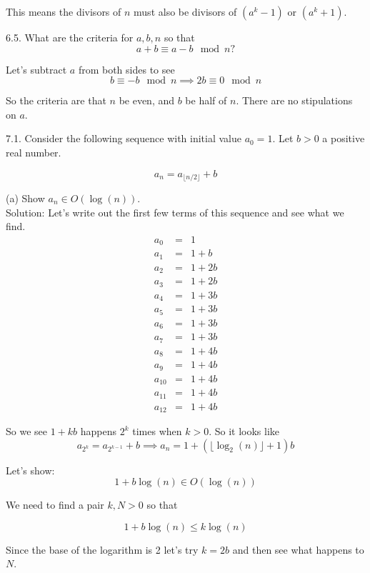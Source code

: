 \documentclass[16 pt]{amsart}
\theoremstyle{definition}
\theoremstyle{remark}
\numberwithin{equation}{subsection}
\begin{document}
This means the divisors of $n$ must also be divisors of $(a^k-1)$ or $(a^k+1)$.



6.5. What are the criteria for $a,b,n$ so that
\[
a+b \equiv a-b \mod{n} ?
\]

Let's subtract $a$ from both sides to see
\[
b \equiv -b \mod n \implies 2b \equiv 0 \mod n
\]

So the criteria are that $n$ be even, and $b$ be half of $n$.  There are no stipulations on $a$.



\newpage

7.1.  Consider the following sequence with initial value $a_0=1$.  Let $b>0$ a positive real number.

\[
a_n = a_{\lfloor n/2 \rfloor} + b
\]

(a) Show $a_n \in O(\log(n))$.\\

Solution:  Let's write out the first few terms of this sequence and see what we find.
\begin{eqnarray}
a_0 & = & 1\nonumber \\
a_1 & = & 1+b\nonumber \\
a_2 & = & 1 + 2b\nonumber \\
a_3 & = & 1+ 2b\nonumber \\
a_4 & = & 1+ 3b\nonumber \\
a_5 & = & 1+3b\nonumber \\
a_6 & = & 1+3b\nonumber \\
a_7 & = & 1+3b\nonumber \\
a_8 & = & 1+4b\nonumber \\
a_9 & = & 1+4b\nonumber \\
a_{10} & = & 1+4b\nonumber \\
a_{11} & = & 1+4b\nonumber \\
a_{12} & = & 1+4b\nonumber 
\end{eqnarray}


So we see $1+kb$ happens $2^k$ times when $k>0$.  
So it looks like
\[
a_{2^k} = a_{2^{k-1}}+b \implies a_n = 1 + (\lfloor \log_2(n) \rfloor +1) b
\]


Let's show:
\[
1 + b \log(n) \in  O(\log(n))
\]


We need to find a pair $k,N>0$ so that 

\[
1+ b\log(n) \le k \log(n)
\]

Since the base of the logarithm is 2 let's try $k=2b$ and then see what happens to $N$.
\end{document}
